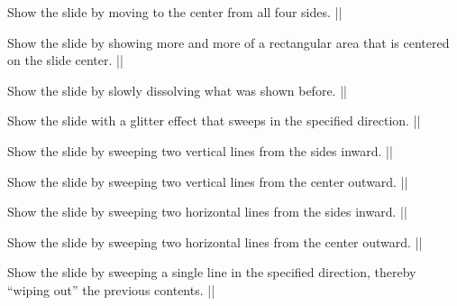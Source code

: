 \begin{command}{\transboxin{}}
  Show the slide by moving to the center from all four sides.
  \example||
\end{command}

\begin{command}{\transboxout{}}
  Show the slide by showing more and more of a rectangular area that is centered on the slide center.
  \example|\transboxout|
\end{command}

\begin{command}{\transdissolve{}}
  Show the slide by slowly dissolving what was shown before.
  \example|\transdissolve[duration=0.2]|
\end{command}

\begin{command}{\transglitter{}}
  Show the slide with a glitter effect that sweeps in the specified direction.
  \example||
\end{command}

\begin{command}{\transsplitverticalin{}}
  Show the slide by sweeping two vertical lines from the sides inward.
  \example|\transsplitverticalin|
\end{command}

\begin{command}{\transsplitverticalout{}}
  Show the slide by sweeping two vertical lines from the center outward.
  \example|\transsplitverticalout|
\end{command}

\begin{command}{\transsplithorizontalin{}}
  Show the slide by sweeping two horizontal lines from the sides inward.
  \example|\transsplithorizontalin|
\end{command}

\begin{command}{\transsplithorizontalout{}}
  Show the slide by sweeping two horizontal lines from the center outward.
  \example|\transsplithorizontalout|
\end{command}

\begin{command}{\transwipe{}}
  Show the slide by sweeping a single line in the specified direction, thereby ``wiping out'' the previous contents.
  \example|\transwipe[direction=90]|
\end{command}

